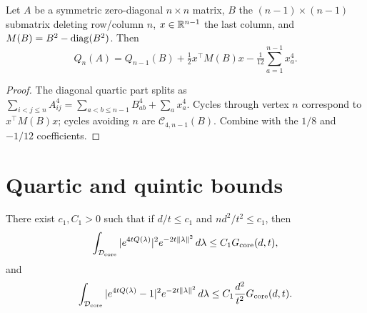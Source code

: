 \begin{lemma}\label{lem:peeling}
\leanok
{}
Let $A$ be a symmetric zero-diagonal $n\times n$ matrix, $B$ the
$(n{-}1)\times(n{-}1)$ submatrix deleting row/column $n$,
$x\in\mathbb{R}^{n-1}$ the last column, and $M(B)=B^2-\operatorname{diag}(B^2)$. Then
\[
  Q_n(A)=Q_{n-1}(B)+\tfrac12 x^\top M(B)x-\tfrac{1}{12}\sum_{a=1}^{n-1}x_a^4.
\]
\end{lemma}

\begin{proof}\leanok
The diagonal quartic part splits as
$\sum_{i<j\le n}A_{ij}^4=\sum_{a<b\le n-1}B_{ab}^4+\sum_a x_a^4$.
Cycles through vertex $n$ correspond to $x^\top M(B)x$;
cycles avoiding $n$ are $\mathcal{C}_{4,n-1}(B)$.
Combine with the $1/8$ and $-1/12$ coefficients.
\end{proof}

\section{Quartic and quintic bounds}

\begin{proposition}\label{prop:quartic-bounds}
\leanok
{}
There exist $c_1,C_1>0$ such that if $d/t\le c_1$ and $nd^2/t^2\le c_1$,
then
\[
  \int_{\mathcal{D}_\mathrm{core}}|e^{4tQ(\lambda)}|^2 e^{-2t\|\lambda\|^2}\,d\lambda
  \le C_1G_{\mathrm{core}}(d,t),
\]
and
\[
  \int_{\mathcal{D}_\mathrm{core}}|e^{4tQ(\lambda)}-1|^2 e^{-2t\|\lambda\|^2}\,d\lambda
  \le C_1\frac{d^2}{t^2}G_{\mathrm{core}}(d,t).
\]
\end{proposition}

